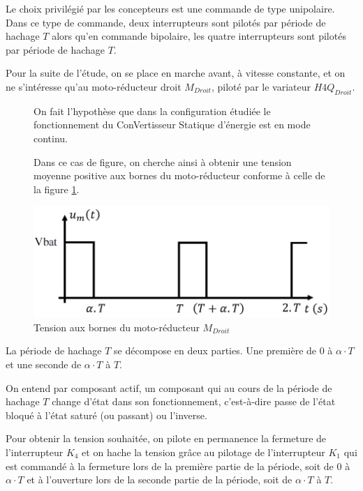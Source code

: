 Le choix privilégié par les concepteurs est une commande de type unipolaire. Dans ce type de commande, deux interrupteurs sont pilotés par période de hachage $T$ alors qu'en commande bipolaire, les quatre interrupteurs sont pilotés par période de hachage $T$.

Pour la suite de l'étude, on se place en marche avant, à vitesse constante, et on ne s'intéresse qu'au moto-réducteur droit $M_{Droit}$, piloté par le variateur $H4Q_{Droit}$.

\begin{figure}[ht!]
\begin{minipage}{0.65\linewidth}
On fait l'hypothèse que dans la configuration étudiée le fonctionnement du ConVertisseur Statique d'énergie est en mode continu.

Dans ce cas de figure, on cherche ainsi à obtenir une tension moyenne positive aux bornes du moto-réducteur conforme à celle de la figure \ref{fig06}.
\end{minipage}\hfill
\begin{minipage}{0.3\linewidth}
\centering\includegraphics[width=0.9\linewidth]{img/fig06.png}
\caption{\label{fig06} Tension aux bornes du moto-réducteur $M_{Droit}$}
\end{minipage}
\end{figure}

La période de hachage $T$ se décompose en deux parties. Une première de 0 à $\alpha\cdot T$ et une seconde de $\alpha\cdot T$ à $T$.

On entend par composant actif, un composant qui au cours de la période de hachage $T$ change d'état dans son fonctionnement, c'est-à-dire passe de l'état bloqué à l'état saturé (ou passant) ou l'inverse.

\newpage

Pour obtenir la tension souhaitée, on pilote en permanence la fermeture de l'interrupteur $K_4$ et on hache la tension grâce au pilotage de l'interrupteur $K_1$ qui est commandé à la fermeture lors de 
la première partie de la période, soit de 0 à $\alpha\cdot T$ et à l'ouverture lors de la seconde partie de la période, soit de $\alpha\cdot T$ à $T$.

